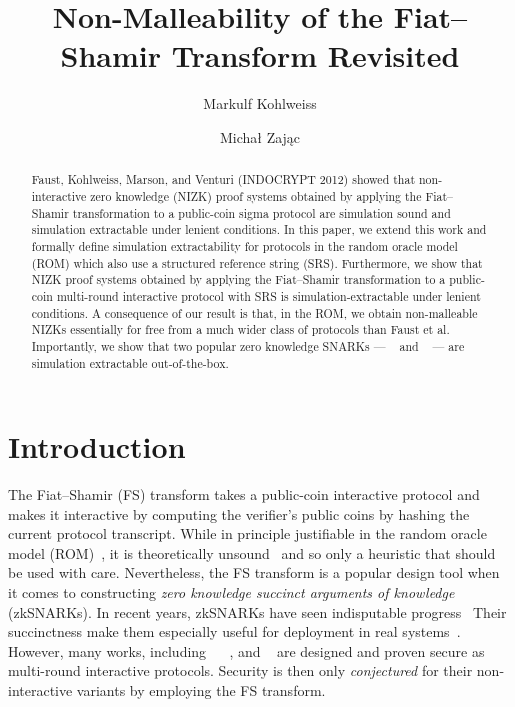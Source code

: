 \documentclass[runningheads,10pt]{llncs}
\title{Non-Malleability of the Fiat--Shamir Transform Revisited}
\author{Markulf Kohlweiss\inst{1,2} \and Michał Zając\inst{3}}
\institute{University of Edinburgh, Edinburgh, UK \and IOHK \\
\email{mkohlwei@inf.ed.ac.uk} \and Clearmatics, London, UK \\
\email{m.p.zajac@gmail.com}}
\begin{document}
 \sloppy \maketitle

\begin{abstract}
  Faust, Kohlweiss, Marson, and Venturi (INDOCRYPT 2012) showed that  non-interactive zero knowledge (NIZK) proof systems obtained by applying the
  Fiat--Shamir transformation to a public-coin sigma protocol are
  simulation sound and simulation extractable under lenient conditions. In this
  paper, we extend this work and formally define
  simulation extractability for protocols in the random oracle model (ROM) which also use a structured reference string (SRS). Furthermore, we show that NIZK
  proof systems obtained by applying the Fiat--Shamir transformation to a
  public-coin multi-round interactive protocol with SRS is
  simulation-extractable under lenient conditions. A consequence of our result
  is that, in the ROM, we obtain non-malleable NIZKs essentially for free from a
  much wider class of protocols than Faust et al. Importantly, we show that two
  popular zero knowledge SNARKs --- \plonk{}~\cite{EPRINT:GabWilCio19} and
  \sonic{}~\cite{CCS:MBKM19} --- are simulation extractable out-of-the-box.
\end{abstract}

\section{Introduction}
The Fiat--Shamir (FS) transform takes a public-coin interactive protocol and makes it
interactive by computing the verifier's public coins by hashing the current
protocol transcript. While in principle justifiable in the random oracle model
(ROM)~\cite{CCS:BelRog93}, it is theoretically unsound~\cite{FOCS:GolKal03} and
so only a heuristic that should be used with care.
%
Nevertheless, the FS transform is a popular design tool when it comes to
constructing \emph{zero knowledge succinct arguments of knowledge}
(zkSNARKs). In recent years, zkSNARKs have seen indisputable
progress~\cite{AC:Groth10a,TCC:Lipmaa12,EC:GGPR13,SP:PHGR13,AC:Lipmaa13,AC:DFGK14,EC:Groth16,SP:BBBPWM18}
Their succinctness make them especially useful for deployment in real
systems~\cite{REPO:Zcash20,ARXIV:RonZaj19,REPO:Zeth20,REPO:Celo20,REPO:Aztec20}. However,
many works, including \sonic{}~\cite{CCS:MBKM19}
\plonk{}~\cite{EPRINT:GabWilCio19}, and \marlin~\cite{EC:CHMMVW20} are designed
and proven secure as multi-round interactive protocols. Security is then only
\emph{conjectured} for their non-interactive variants by employing the FS
transform.
\end{document}
